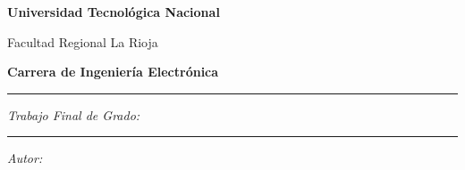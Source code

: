 \begin{titlepage}
  \sffamily\setlength{\parskip}{1pt}
  \begin{center}
    \logoutn{16mm}\par\vspace{3mm}
    {\Large\bfseries\color{m2navy} Universidad Tecnológica Nacional\par}
    {\large\color{m2navy} Facultad Regional La Rioja\par}
    \vspace{2mm}
    {\large\bfseries\color{m2teal} Carrera de Ingeniería Electrónica\par}
    \vspace{1mm}
    {\color{m2amber}\rule{\textwidth}{1.4pt}\par}
  \end{center}
  {\small\itshape\color{m2grey} Trabajo Final de Grado:\par}
  \begin{center}
    {\LARGE\bfseries\color{m2navy}\parbox{0.7\textwidth}{\centering\titulotrabajo}\par}
    \vspace{2mm}{\large\color{m2teal}\subtitulotrabajo\par}
    \vspace{2mm}
    {\color{m2amber}\rule{\textwidth}{1.4pt}\par}
  \end{center}
  {\small\itshape\color{m2grey} Autor:\par}
  \begin{center}
    {\large\color{m2navy}\autor\par}
  \end{center}


\end{titlepage}
